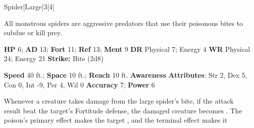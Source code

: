   \begin{monsection}{Spider}[Large]{3}[4]
    \vspace{-1em}\vspace{-1em}
    \vspace{0em}

    
    All monstrous spiders are aggressive predators that use their poisonous bites to subdue or kill prey.
  

    \begin{spellcontent}
      \begin{spelltargetinginfo}
        \pari \textbf{HP} 6;
          \textbf{AD} 13;
          \textbf{Fort} 11;
          \textbf{Ref} 13;
          \textbf{Ment} 9
        \pari \textbf{DR} Physical 7; Energy 4
        \pari \textbf{WR} Physical 24; Energy 21
        \pari \textbf{Strike:}
            Bite  (2d8)
      \end{spelltargetinginfo}
    \end{spellcontent}
    \begin{monsterfooter}
      \pari \textbf{Speed} 40 ft.;
        \textbf{Space} 10 ft.;
        \textbf{Reach} 10 ft.
      \pari \textbf{Awareness} 
      \pari \textbf{Attributes}:
        Str 2, Dex 5,
        Con 0, Int -9,
        Per 4, Wil 0
      \pari \textbf{Accuracy} 7;
        \textbf{Power} 6
    \end{monsterfooter}
  \end{monsection}
    Whenever a creature takes damage from the large spider's bite,
      if the attack result beat the target's Fortitude defense,
      the damaged creature becomes .
    The poison's primary effect makes the target , and the terminal effect makes it 
  
